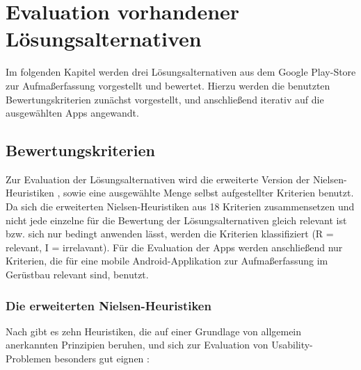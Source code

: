 \chapter{Evaluation vorhandener Lösungsalternativen}
Im folgenden Kapitel werden drei Lösungsalternativen aus dem Google Play-Store zur Aufmaßerfassung vorgestellt und bewertet. Hierzu werden die benutzten Bewertungskriterien zunächst vorgestellt, und anschließend iterativ auf die ausgewählten Apps angewandt.

\section{Bewertungskriterien}
Zur Evaluation der Lösungsalternativen wird die erweiterte Version der Nielsen-Heuristiken \citep{Nielsen94}, sowie eine ausgewählte Menge selbst aufgestellter Kriterien benutzt.
Da sich die erweiterten Nielsen-Heuristiken aus 18 Kriterien zusammensetzen und nicht jede einzelne für die Bewertung der Lösungsalternativen gleich relevant ist bzw. sich nur bedingt anwenden lässt, werden die Kriterien klassifiziert (R = relevant, I = irrelavant).
Für die Evaluation der Apps werden anschließend nur Kriterien, die für eine mobile Android-Applikation zur Aufmaßerfassung im Gerüstbau relevant sind, benutzt.

\subsection{Die erweiterten Nielsen-Heuristiken}\label{subsec:nielsen}
Nach \citeauthor{Nielsen94} gibt es zehn Heuristiken, die auf einer Grundlage von allgemein anerkannten Prinzipien beruhen, und sich zur Evaluation von Usability-Problemen besonders gut eignen \citep[Seiten 25--62]{Nielsen94}: 

\begin{enumerate}
\end{enumerate} 

